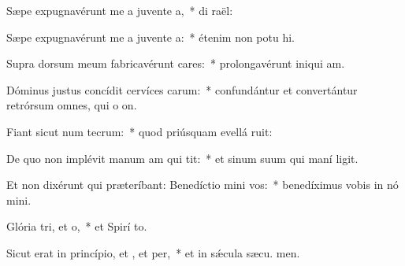 \item Sæpe expugnavérunt me a juvente a,~* di  raël:
\item Sæpe expugnavérunt me a juvente a:~* étenim non potu hi.
\item Supra dorsum meum fabricavérunt cares:~* prolongavérunt iniqui am.
\item Dóminus justus concídit cervíces carum:~* confundántur et convertántur retrórsum omnes, qui o on.
\item Fiant sicut num tecrum:~* quod priúsquam evellá ruit:
\item De quo non implévit manum am qui tit:~* et sinum suum qui maní ligit.
\item Et non dixérunt qui præteríbant: Benedíctio mini  vos:~* benedíximus vobis in nó mini.
\item Glória tri, et o,~* et Spirí to.
\item Sicut erat in princípio, et , et per,~* et in sǽcula sæcu. men.
